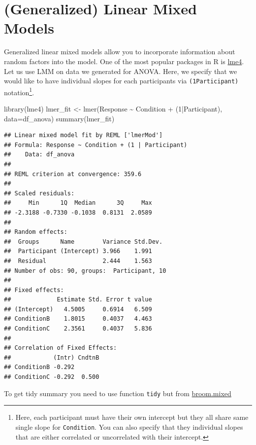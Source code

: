 \documentclass[
]{book}
\newenvironment{Shaded}{\begin{snugshade}}{\end{snugshade}}
\newcommand{\AttributeTok}[1]{\textcolor[rgb]{0.77,0.63,0.00}{#1}}
\newcommand{\DecValTok}[1]{\textcolor[rgb]{0.00,0.00,0.81}{#1}}
\newcommand{\FunctionTok}[1]{\textcolor[rgb]{0.00,0.00,0.00}{#1}}
\newcommand{\NormalTok}[1]{#1}
\newcommand{\OtherTok}[1]{\textcolor[rgb]{0.56,0.35,0.01}{#1}}
\newcommand{\SpecialCharTok}[1]{\textcolor[rgb]{0.00,0.00,0.00}{#1}}
\begin{document}
\hypertarget{generalized-linear-mixed-models}{%
\section{(Generalized) Linear Mixed Models}\label{generalized-linear-mixed-models}}

Generalized linear mixed models allow you to incorporate information about random factors into the model. One of the most popular packages in R is \href{https://github.com/lme4/lme4}{lme4}. Let us use LMM on data we generated for ANOVA. Here, we specify that we would like to have individual slopes for each participants via \texttt{(1\textbar{}Participant)} notation\footnote{Here, each participant must have their own intercept but they all share same single slope for \texttt{Condition}. You can also specify that they individual slopes that are either correlated or uncorrelated with their intercept.}.

\begin{Shaded}
\begin{Highlighting}[]
\FunctionTok{library}\NormalTok{(lme4)}
\NormalTok{lmer\_fit }\OtherTok{\textless{}{-}} \FunctionTok{lmer}\NormalTok{(Response }\SpecialCharTok{\textasciitilde{}}\NormalTok{ Condition }\SpecialCharTok{+}\NormalTok{ (}\DecValTok{1}\SpecialCharTok{|}\NormalTok{Participant), }\AttributeTok{data=}\NormalTok{df\_anova)}
\FunctionTok{summary}\NormalTok{(lmer\_fit)}
\end{Highlighting}
\end{Shaded}

\begin{verbatim}
## Linear mixed model fit by REML ['lmerMod']
## Formula: Response ~ Condition + (1 | Participant)
##    Data: df_anova
## 
## REML criterion at convergence: 359.6
## 
## Scaled residuals: 
##     Min      1Q  Median      3Q     Max 
## -2.3188 -0.7330 -0.1038  0.8131  2.0589 
## 
## Random effects:
##  Groups      Name        Variance Std.Dev.
##  Participant (Intercept) 3.966    1.991   
##  Residual                2.444    1.563   
## Number of obs: 90, groups:  Participant, 10
## 
## Fixed effects:
##             Estimate Std. Error t value
## (Intercept)   4.5005     0.6914   6.509
## ConditionB    1.8015     0.4037   4.463
## ConditionC    2.3561     0.4037   5.836
## 
## Correlation of Fixed Effects:
##            (Intr) CndtnB
## ConditionB -0.292       
## ConditionC -0.292  0.500
\end{verbatim}

To get tidy summary you need to use function \texttt{tidy} but from \href{https://github.com/bbolker/broom.mixed}{broom.mixed}
\end{document}
